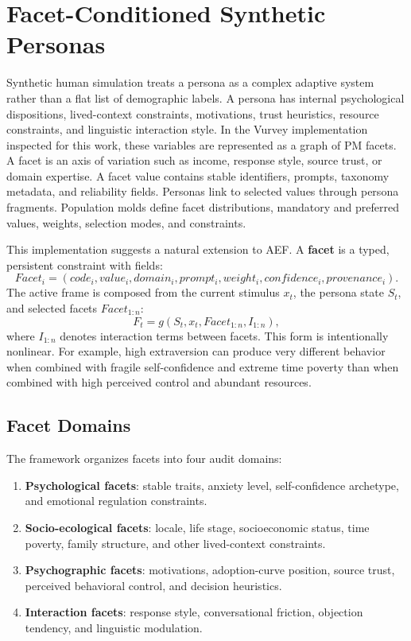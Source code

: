 \documentclass[10pt,a4paper]{article}
\newcommand{\method}{AEF}
\begin{document}
\section{Facet-Conditioned Synthetic Personas}
Synthetic human simulation treats a persona as a complex adaptive system rather than a flat list of demographic labels. A persona has internal psychological dispositions, lived-context constraints, motivations, trust heuristics, resource constraints, and linguistic interaction style. In the Vurvey implementation inspected for this work, these variables are represented as a graph of PM facets. A facet is an axis of variation such as income, response style, source trust, or domain expertise. A facet value contains stable identifiers, prompts, taxonomy metadata, and reliability fields. Personas link to selected values through persona fragments. Population molds define facet distributions, mandatory and preferred values, weights, selection modes, and constraints.

This implementation suggests a natural extension to \method. A \textbf{facet} is a typed, persistent constraint with fields:
\begin{equation}
Facet_i = (code_i, value_i, domain_i, prompt_i, weight_i, confidence_i, provenance_i).
\end{equation}
The active frame is composed from the current stimulus $x_t$, the persona state $S_t$, and selected facets $Facet_{1:n}$:
\begin{equation}
F_t = g(S_t, x_t, Facet_{1:n}, I_{1:n}),
\end{equation}
where $I_{1:n}$ denotes interaction terms between facets. This form is intentionally nonlinear. For example, high extraversion can produce very different behavior when combined with fragile self-confidence and extreme time poverty than when combined with high perceived control and abundant resources.

\subsection{Facet Domains}
The framework organizes facets into four audit domains:
\begin{enumerate}[leftmargin=*]
  \item \textbf{Psychological facets}: stable traits, anxiety level, self-confidence archetype, and emotional regulation constraints.
  \item \textbf{Socio-ecological facets}: locale, life stage, socioeconomic status, time poverty, family structure, and other lived-context constraints.
  \item \textbf{Psychographic facets}: motivations, adoption-curve position, source trust, perceived behavioral control, and decision heuristics.
  \item \textbf{Interaction facets}: response style, conversational friction, objection tendency, and linguistic modulation.
\end{enumerate}
\end{document}
